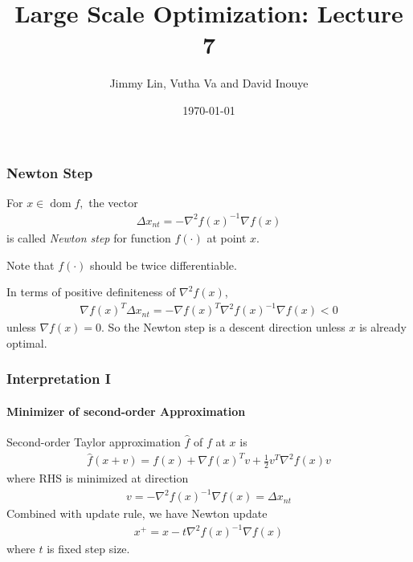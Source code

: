 \documentclass{beamer}
\title{Large Scale Optimization: Lecture 7}
\author{Jimmy Lin, Vutha Va and David Inouye}
\institute[]{The University of Texas at Austin}
\date{\today}
\DeclareMathOperator{\dom}{dom}
\begin{document}
\begin{frame}
\titlepage
\end{frame}

\begin{frame}
\frametitle{Newton Step}
\begin{definition}
    For $x \in \dom f,$ the vector 
    \begin{align}
        \Delta x_{nt} = - \nabla^2 f(x)^{-1} \nabla f(x)
    \end{align}
    is called {\it Newton step} for function $f(\cdot)$ at point $x$. 
\end{definition}
    Note that $f(\cdot)$ should be twice differentiable. 

In terms of positive definiteness of $\nabla^2 f(x)$, 
    \begin{align}
        \nabla f(x)^T \Delta x_{nt} = -\nabla f(x)^T \nabla^2 f(x)^{-1} \nabla f(x) < 0
    \end{align}
unless $\nabla f(x) = 0$. So the Newton step is a descent direction unless $x$ is
already optimal.
\end{frame}
\begin{frame}
\frametitle{Interpretation I}
\framesubtitle{Minimizer of second-order Approximation}
    Second-order Taylor approximation $\hat{f}$ of $f$ at $x$ is
    \begin{align}
    \hat{f}(x+v) = f(x) + \nabla f(x)^T v + \frac{1}{2} v^T \nabla^2 f(x) v
    \end{align}
    where RHS is minimized at direction
    \begin{align}
        v = - \nabla^2 f(x)^{-1} \nabla f(x) = \Delta x_{nt} 
    \end{align}
Combined with update rule, we have Newton update
    \begin{align}
    x^{+} = x - t \nabla^2 f(x)^{-1} \nabla f(x)
    \end{align}
    where $t$ is fixed step size.
\end{frame}
\end{document}
